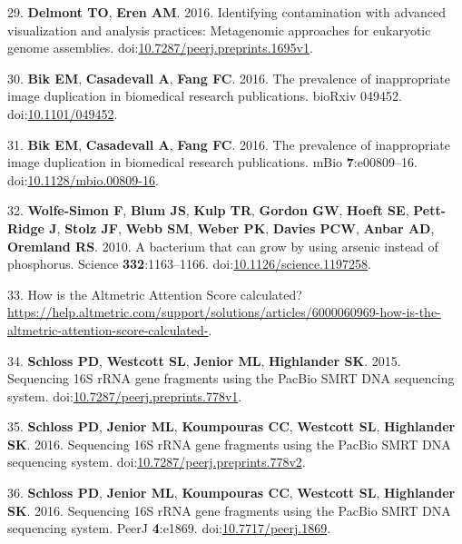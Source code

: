 \documentclass[11pt,]{article}
\begin{document}
\hypertarget{ref-Delmont2016}{}
29. \textbf{Delmont TO}, \textbf{Eren AM}. 2016. Identifying
contamination with advanced visualization and analysis practices:
Metagenomic approaches for eukaryotic genome assemblies.
doi:\href{https://doi.org/10.7287/peerj.preprints.1695v1}{10.7287/peerj.preprints.1695v1}.

\hypertarget{ref-Bik2016a}{}
30. \textbf{Bik EM}, \textbf{Casadevall A}, \textbf{Fang FC}. 2016. The
prevalence of inappropriate image duplication in biomedical research
publications. bioRxiv 049452.
doi:\href{https://doi.org/10.1101/049452}{10.1101/049452}.

\hypertarget{ref-Bik2016b}{}
31. \textbf{Bik EM}, \textbf{Casadevall A}, \textbf{Fang FC}. 2016. The
prevalence of inappropriate image duplication in biomedical research
publications. mBio \textbf{7}:e00809--16.
doi:\href{https://doi.org/10.1128/mbio.00809-16}{10.1128/mbio.00809-16}.

\hypertarget{ref-WolfeSimon2010}{}
32. \textbf{Wolfe-Simon F}, \textbf{Blum JS}, \textbf{Kulp TR},
\textbf{Gordon GW}, \textbf{Hoeft SE}, \textbf{Pett-Ridge J},
\textbf{Stolz JF}, \textbf{Webb SM}, \textbf{Weber PK}, \textbf{Davies
PCW}, \textbf{Anbar AD}, \textbf{Oremland RS}. 2010. A bacterium that
can grow by using arsenic instead of phosphorus. Science
\textbf{332}:1163--1166.
doi:\href{https://doi.org/10.1126/science.1197258}{10.1126/science.1197258}.

\hypertarget{ref-Altmetric}{}
33. How is the Altmetric Attention Score calculated?
\url{https://help.altmetric.com/support/solutions/articles/6000060969-how-is-the-altmetric-attention-score-calculated-}.

\hypertarget{ref-Schloss2015}{}
34. \textbf{Schloss PD}, \textbf{Westcott SL}, \textbf{Jenior ML},
\textbf{Highlander SK}. 2015. Sequencing 16S rRNA gene fragments using
the PacBio SMRT DNA sequencing system.
doi:\href{https://doi.org/10.7287/peerj.preprints.778v1}{10.7287/peerj.preprints.778v1}.

\hypertarget{ref-Schloss2016a}{}
35. \textbf{Schloss PD}, \textbf{Jenior ML}, \textbf{Koumpouras CC},
\textbf{Westcott SL}, \textbf{Highlander SK}. 2016. Sequencing 16S rRNA
gene fragments using the PacBio SMRT DNA sequencing system.
doi:\href{https://doi.org/10.7287/peerj.preprints.778v2}{10.7287/peerj.preprints.778v2}.

\hypertarget{ref-Schloss2016b}{}
36. \textbf{Schloss PD}, \textbf{Jenior ML}, \textbf{Koumpouras CC},
\textbf{Westcott SL}, \textbf{Highlander SK}. 2016. Sequencing 16S rRNA
gene fragments using the PacBio SMRT DNA sequencing system. PeerJ
\textbf{4}:e1869.
doi:\href{https://doi.org/10.7717/peerj.1869}{10.7717/peerj.1869}.
\end{document}

